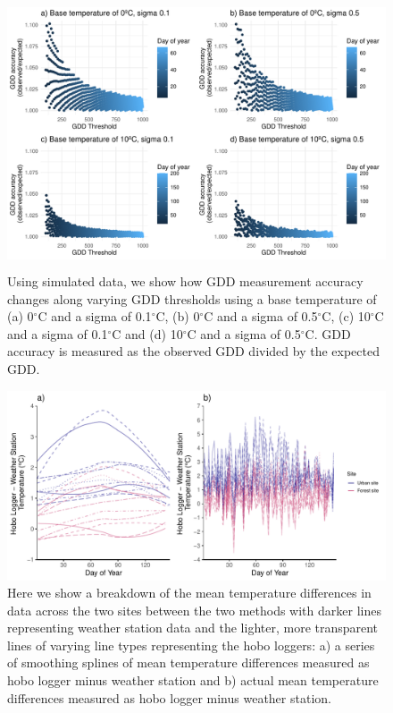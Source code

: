 \documentclass{article}\usepackage[]{graphicx}\usepackage[]{color}
\begin{document}
\begin{figure}[H]
    \centering
    \includegraphics[height=8cm, width=12cm]{..//analyses/figures/gddratio_fstars.pdf}
\caption{Using simulated data, we show how GDD measurement accuracy changes along varying GDD thresholds using a base temperature of (a) 0$^{\circ}$C and a sigma of 0.1$^{\circ}$C, (b) 0$^{\circ}$C and a sigma of 0.5$^{\circ}$C, (c) 10$^{\circ}$C and a sigma of 0.1$^{\circ}$C and (d) 10$^{\circ}$C and a sigma of 0.5$^{\circ}$C. GDD accuracy is measured as the observed GDD divided by the expected GDD. }
\label{fig:forecasts}
\end{figure}
  
{\begin{figure} [H]
  \begin{center}
  \includegraphics[width=16cm]{..//analyses/figures/climate_methodiff.pdf}
  \caption{Here we show a breakdown of the mean temperature differences in data across the two sites between the two methods with darker lines representing weather station data and the lighter, more transparent lines of varying line types representing the hobo loggers: a) a series of smoothing splines of mean temperature differences measured as hobo logger minus weather station and b) actual mean temperature differences measured as hobo logger minus weather station. }\label{fig:climdiffs}
  \end{center}
  \end{figure}}
  
\end{document}
